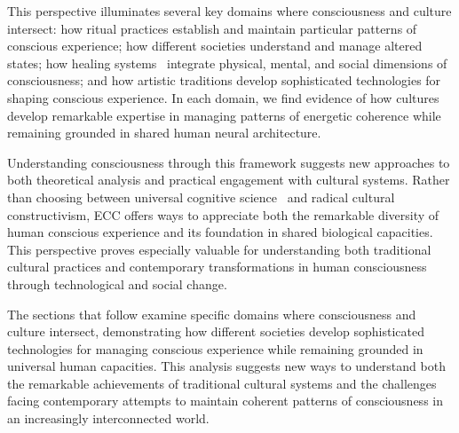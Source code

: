This perspective illuminates several key domains where consciousness and culture intersect: how ritual practices establish and maintain particular patterns of conscious experience; how different societies understand and manage altered states; how healing systems~ integrate physical, mental, and social dimensions of consciousness; and how artistic traditions develop sophisticated technologies for shaping conscious experience. In each domain, we find evidence of how cultures develop remarkable expertise in managing patterns of energetic coherence while remaining grounded in shared human neural architecture.

Understanding consciousness through this framework suggests new approaches to both theoretical analysis and practical engagement with cultural systems. Rather than choosing between universal cognitive science~ and radical cultural constructivism, ECC offers ways to appreciate both the remarkable diversity of human conscious experience and its foundation in shared biological capacities. This perspective proves especially valuable for understanding both traditional cultural practices and contemporary transformations in human consciousness through technological and social change.

The sections that follow examine specific domains where consciousness and culture intersect, demonstrating how different societies develop sophisticated technologies for managing conscious experience while remaining grounded in universal human capacities. This analysis suggests new ways to understand both the remarkable achievements of traditional cultural systems and the challenges facing contemporary attempts to maintain coherent patterns of consciousness in an increasingly interconnected world.








